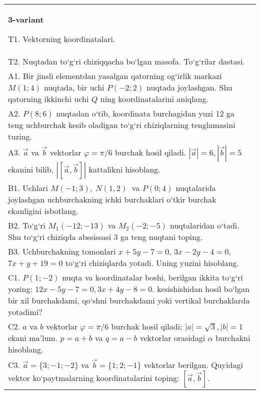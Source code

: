 \documentclass{article}
\begin{document}
\begin{tabular}{m{17cm}}
\textbf{3-variant}

T1. 
Vektorning koordinatalari.
 \\
T2. 
Nuqtadan to‘g‘ri chiziqqacha bo‘lgan masofa. To‘g‘rilar dastasi.
 \\
A1. 
Bir jinsli elementdan yasalgan qatorning og‘irlik markazi
$M (1;4) $ nuqtada, bir uchi $P (-2;2) $ nuqtada joylashgan. Shu
qatorning ikkinchi uchi $Q$ ning koordinatalarini aniqlang.
 \\
A2. 
$P (8;6) $ nuqtadan o‘tib, koordinata burchagidan
yuzi 12 ga teng uchburchak kesib oladigan to‘g‘ri chiziqlarning tenglamasini
tuzing.
 \\
A3. 
$\overrightarrow{a}$ va $\overrightarrow{b}$ vektorlar
$\varphi = \pi/6$ burchak hosil qiladi.
$|\overrightarrow{a}| = 6,|\overrightarrow{b}| = 5$ ekanini bilib,
$\left| \left\lbrack \overrightarrow{a},\overrightarrow{b} \right\rbrack \right|$ kattalikni hisoblang.
 \\
B1. 
Uchlari \(M (-1;3),\ N (1,2) \ \) va \(P (0;4) \)
nuqtalarida joylashgan uchburchakning ichki burchaklari o‘tkir burchak
ekanligini isbotlang.
 \\
B2. 
To‘g‘ri \(M_{1} (-12;-13) \) va \(M_{2} (-2;-5) \)
nuqtalaridan o‘tadi. Shu to‘g‘ri chiziqda abssissasi 3 ga teng nuqtani toping.
 \\
B3. 
Uchburchakning tomonlari \(x+5y-7=0\),
\(3x-2y-4=0\), \(7x+y+19=0\) to‘g‘ri chiziqlarda yotadi. Uning
yuzini hisoblang.
 \\
C1. 
\(P (1;-2) \) nuqta va koordinatalar boshi, berilgan ikkita
to‘g‘ri yozing: $12x-5y-7=0, 3x+4y-8=0$.
kesishishidan hosil bo‘lgan bir xil burchakdami, qo‘shni burchakdami yoki vertikal
burchaklarda yotadimi?
 \\
C2. 
$a$ va $b$ vektorlar $\varphi = \pi/6$ burchak hosil qiladi; $|a| = \sqrt{3},|b| = 1$ ekani ma’lum. $p = a + b$ va $q = a - b$ vektorlar orasidagi $\alpha$ burchakni hisoblang.
 \\
C3. 
$\vec{a} = \{ 3; - 1; - 2\}$ va $\vec{b} = \{ 1;2; - 1\}$ vektorlar berilgan. Quyidagi vektor ko‘paytmalarning koordinatalarini toping:
$\left\lbrack \vec{a},\vec{b} \right\rbrack$.
 \\

\end{tabular}
\vspace{1cm}
\end{document}
